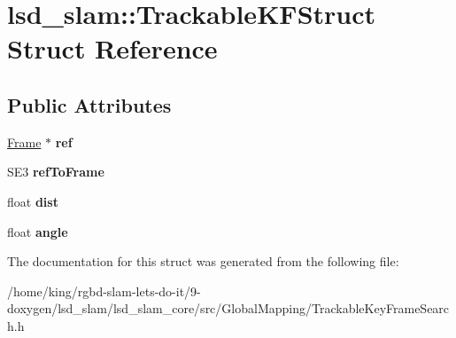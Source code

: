 \hypertarget{structlsd__slam_1_1_trackable_k_f_struct}{\section{lsd\-\_\-slam\-:\-:Trackable\-K\-F\-Struct Struct Reference}
\label{structlsd__slam_1_1_trackable_k_f_struct}
}
\subsection*{Public Attributes}
\begin{DoxyCompactItemize}
\item 
\hypertarget{structlsd__slam_1_1_trackable_k_f_struct_a37f36ea301ca878562a4e51040804fc1}{\hyperlink{classlsd__slam_1_1_frame}{Frame} $\ast$ {\bfseries ref}}\label{structlsd__slam_1_1_trackable_k_f_struct_a37f36ea301ca878562a4e51040804fc1}

\item 
\hypertarget{structlsd__slam_1_1_trackable_k_f_struct_a543c7b1020eb1da59c0b4d5faf413bcd}{S\-E3 {\bfseries ref\-To\-Frame}}\label{structlsd__slam_1_1_trackable_k_f_struct_a543c7b1020eb1da59c0b4d5faf413bcd}

\item 
\hypertarget{structlsd__slam_1_1_trackable_k_f_struct_a574f276b489cbf38e3923ddbd3b79d7a}{float {\bfseries dist}}\label{structlsd__slam_1_1_trackable_k_f_struct_a574f276b489cbf38e3923ddbd3b79d7a}

\item 
\hypertarget{structlsd__slam_1_1_trackable_k_f_struct_a6daae77946689b75a57e27d06c143e22}{float {\bfseries angle}}\label{structlsd__slam_1_1_trackable_k_f_struct_a6daae77946689b75a57e27d06c143e22}

\end{DoxyCompactItemize}


The documentation for this struct was generated from the following file\-:\begin{DoxyCompactItemize}
\item 
/home/king/rgbd-\/slam-\/lets-\/do-\/it/9-\/doxygen/lsd\-\_\-slam/lsd\-\_\-slam\-\_\-core/src/\-Global\-Mapping/Trackable\-Key\-Frame\-Search.\-h\end{DoxyCompactItemize}

